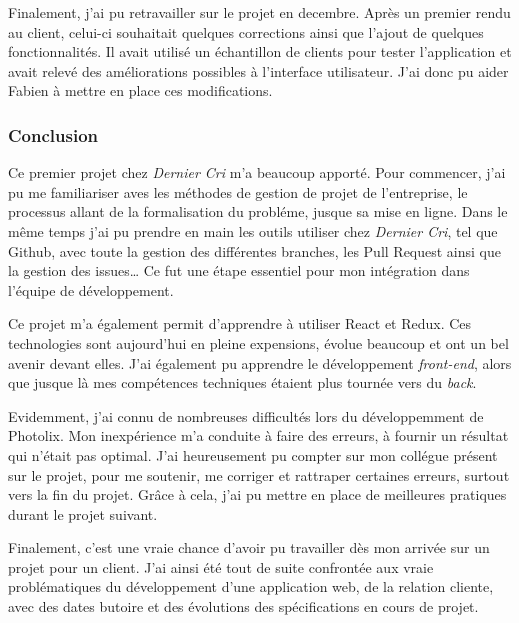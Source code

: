\documentclass[12pt,a4paper]{article}
\begin{document}
  \bigskip

  Finalement, j'ai pu retravailler sur le projet en decembre. Après un
  premier rendu au client, celui-ci souhaitait quelques corrections ainsi
  que l'ajout de quelques fonctionnalités. Il avait utilisé un échantillon
  de clients pour tester l'application et avait relevé des améliorations
  possibles à l'interface utilisateur. J'ai donc pu aider Fabien à mettre
  en place ces modifications.

  \bigskip

  \subsubsection{Conclusion}\label{conclusion}

  \bigskip

  Ce premier projet chez \emph{Dernier Cri} m'a beaucoup apporté. Pour
  commencer, j'ai pu me familiariser aves les méthodes de gestion de
  projet de l'entreprise, le processus allant de la formalisation du
  probléme, jusque sa mise en ligne. Dans le même temps j'ai pu prendre en
  main les outils utiliser chez \emph{Dernier Cri}, tel que Github, avec
  toute la gestion des différentes branches, les Pull Request ainsi que la
  gestion des issues\ldots{} Ce fut une étape essentiel pour mon
  intégration dans l'équipe de développement.

  \bigskip

  Ce projet m'a également permit d'apprendre à utiliser React et Redux.
  Ces technologies sont aujourd'hui en pleine expensions, évolue beaucoup
  et ont un bel avenir devant elles. J'ai également pu apprendre le
  développement \emph{front-end}, alors que jusque là mes compétences
  techniques étaient plus tournée vers du \emph{back}.

  \bigskip

  Evidemment, j'ai connu de nombreuses difficultés lors du développemment
  de Photolix. Mon inexpérience m'a conduite à faire des erreurs, à
  fournir un résultat qui n'était pas optimal. J'ai heureusement pu
  compter sur mon collégue présent sur le projet, pour me soutenir, me
  corriger et rattraper certaines erreurs, surtout vers la fin du projet.
  Grâce à cela, j'ai pu mettre en place de meilleures pratiques durant le
  projet suivant.

  \bigskip

  Finalement, c'est une vraie chance d'avoir pu travailler dès mon arrivée
  sur un projet pour un client. J'ai ainsi été tout de suite confrontée
  aux vraie problématiques du développement d'une application web, de la
  relation cliente, avec des dates butoire et des évolutions des
  spécifications en cours de projet.
\end{document}
